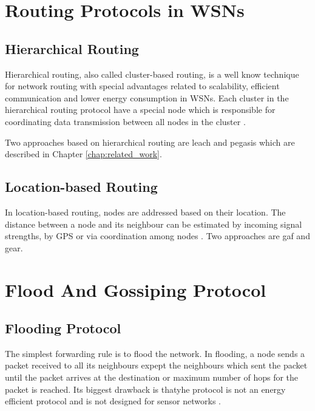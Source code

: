 \documentclass[USenglish]{uit-thesis}
\begin{document}

\section{Routing Protocols in WSNs}
\subsection{Hierarchical Routing}
Hierarchical routing, also called cluster-based routing, is a well know technique for network routing with special advantages related to scalability, efficient communication and lower energy consumption in WSNs. Each cluster in the hierarchical routing protocol have a special node which is responsible for coordinating data transmission between all nodes in the cluster \cite{leach, leach_perf, routing_survey}.


Two approaches based on hierarchical routing are \gls{leach}\cite{leach} and \gls{pegasis}\cite{pegasis} which are described in Chapter \ref{chap:related_work}.


\subsection{Location-based Routing}
In location-based routing, nodes are addressed based on their location. The distance between a node and its neighbour can be estimated by incoming signal strengths, by GPS or via coordination among nodes \cite{routing_survey}. Two approaches are \gls{gaf}\cite{gaf} and \gls{gear}\cite{gear}.


\section{Flood And Gossiping Protocol}
\subsection{Flooding Protocol}
The simplest forwarding rule is to flood the network. In flooding, a node sends a packet received to all its neighbours expept the neighbours which sent the packet until the packet arrives at the destination or maximum number of hops for the packet is reached. Its biggest drawback is thatyhe protocol is not an energy efficient protocol and is not designed for sensor networks \cite{wsnbook}.
\end{document}
